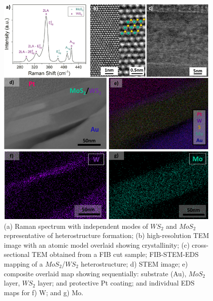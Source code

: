 \begin{figure}[h]
	\begin{center}
		\includegraphics[scale=0.3]{Heterostructures/FIBSTEMEDS.png}
		\caption{(a) Raman spectrum with independent modes of $WS_2$ and $MoS_2$ representative of heterostructure formation; (b) high-resolution TEM image with an atomic model overlaid showing crystallinity; (c) cross-sectional TEM obtained from a FIB cut sample; FIB-STEM-EDS mapping of a $MoS_2$/$WS_2$ heterostructure; d) STEM image; e) composite overlaid map showing sequentially: substrate (Au), $MoS_2$ layer, $WS_2$ layer; and protective Pt coating; and individual EDS maps for f) W; and g) Mo.}
		\label{fig:HeterostructuresFIBSTEMEDS}
	\end{center}
\end{figure}

